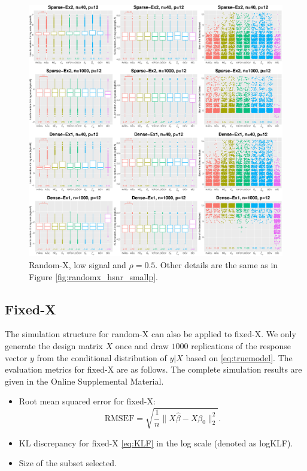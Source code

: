 \begin{figure}[!ht]
  \centering
  \includegraphics[width=\textwidth]{figures/main/randomx/subset_selection/smallp_lsnr.eps}
  \caption{Random-X, low signal and $\rho=0.5$. Other details are the same as in Figure \ref{fig:randomx_hsnr_smallp}.}
  \label{fig:subsetselection_randomx_lsnr_smallp}
\end{figure}
\fi




\subsection{Fixed-X}
The simulation structure for random-X can also be applied to fixed-X. We only generate the design matrix $X$ once and draw $1000$ replications of the response vector $y$ from the conditional distribution of $y|X$ based on \eqref{eq:truemodel}. The evaluation metrics for fixed-X are as follows. The complete simulation results are given in the Online Supplemental Material. 
\begin{itemize}
  \item Root mean squared error for fixed-X:
  \begin{equation*}
    \text{RMSEF} = \sqrt{ \frac{1}{n}\lVert X\hat\beta-X\beta_0 \rVert_2^2 }.
  \end{equation*} 

  \item KL discrepancy for fixed-X \eqref{eq:KLF} in the log scale (denoted as logKLF).

  \item Size of the subset selected.
\end{itemize}

